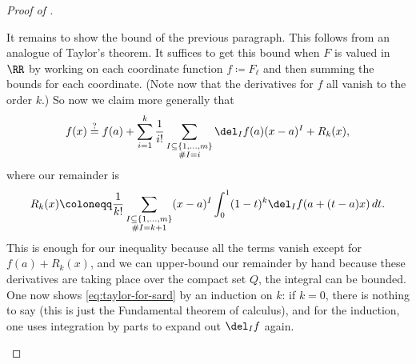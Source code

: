 \documentclass[../notes.tex]{subfiles}
\begin{document}
\begin{proof}[Proof of ]
\begin{enumerate}
		It remains to show the bound of the previous paragraph. This follows from an analogue of Taylor's theorem. It suffices to get this bound when $F$ is valued in $\RR$ by working on each coordinate function $f\coloneqq F_\ell$ and then summing the bounds for each coordinate. (Note now that the derivatives for $f$ all vanish to the order $k$.) So now we claim more generally that
		\begin{equation}
			f(x)\stackrel?=f(a)+\sum_{i=1}^k\frac1{i!}\sum_{\substack{I\subseteq\{1,\ldots,m\}\\\#I=i}}\del_If(a)(x-a)^I+R_k(x), \label{eq:taylor-for-sard}
		\end{equation}
		where our remainder is
		\[R_k(x)\coloneqq\frac1{k!}\sum_{\substack{I\subseteq\{1,\ldots,m\}\\\#I=k+1}}(x-a)^I\int_0^1(1-t)^k\del_If(a+(t-a)x)\,dt.\]
		This is enough for our inequality because all the terms vanish except for $f(a)+R_k(x)$, and we can upper-bound our remainder by hand because these derivatives are taking place over the compact set $Q$, the integral can be bounded. One now shows \eqref{eq:taylor-for-sard} by an induction on $k$: if $k=0$, there is nothing to say (this is just the Fundamental theorem of calculus), and for the induction, one uses integration by parts to expand out $\del_If$ again.
		\qedhere
	\end{enumerate}
\end{proof}
\end{document}
